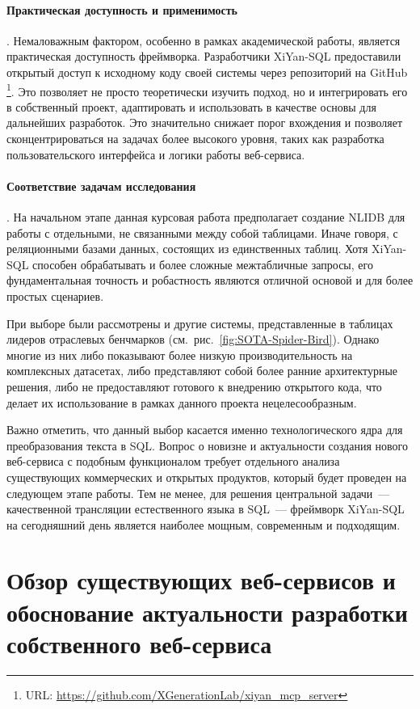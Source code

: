 \paragraph{Практическая доступность и применимость}. Немаловажным фактором,
особенно в рамках академической работы, является практическая доступность фреймворка.
Разработчики XiYan-SQL предоставили открытый доступ к исходному коду своей системы
через репозиторий на GitHub \footnote{URL: \url{https://github.com/XGenerationLab/xiyan_mcp_server}}.
Это позволяет не просто теоретически изучить подход,
но и интегрировать его в собственный проект, адаптировать и использовать в качестве
основы для дальнейших разработок. Это значительно снижает порог вхождения и позволяет
сконцентрироваться на задачах более высокого уровня, таких как разработка
пользовательского интерфейса и логики работы веб-сервиса.

\paragraph{Соответствие задачам исследования}. На начальном этапе данная
курсовая работа предполагает создание NLIDB для работы с отдельными,
не связанными между собой таблицами. Иначе говоря, с реляционными базами данных,
состоящих из единственных таблиц. Хотя XiYan-SQL способен обрабатывать и
более сложные межтабличные запросы,
его фундаментальная точность и робастность являются отличной основой и для более
простых сценариев.

При выборе были рассмотрены и другие системы,
представленные в таблицах лидеров отраслевых бенчмарков (см.~рис.~\ref{fig:SOTA-Spider-Bird}).
Однако многие из них либо показывают более низкую производительность на
комплексных датасетах, либо представляют собой более ранние архитектурные решения,
либо не предоставляют готового к внедрению открытого кода, что делает их
использование в рамках данного проекта нецелесообразным.

Важно отметить, что данный выбор касается именно технологического ядра
для преобразования текста в SQL. Вопрос о новизне и актуальности создания
нового веб-сервиса с подобным функционалом требует отдельного анализа
существующих коммерческих и открытых продуктов, который будет проведен
на следующем этапе работы. Тем не менее, для решения центральной
задачи~--- качественной трансляции естественного языка в SQL~--- фреймворк
XiYan-SQL на сегодняшний день является наиболее мощным, современным и подходящим.




\section{Обзор существующих веб-сервисов и обоснование актуальности разработки собственного веб-сервиса}

